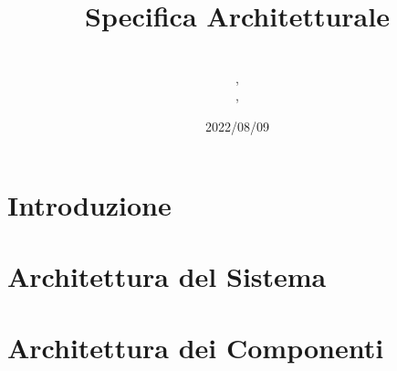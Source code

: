 \documentclass{classes/base}
\title{Specifica Architetturale}
\date{2022/08/09}
\author{\\ \marcov, \\ \marcob, \\ \matteo}
\begin{document}
	\maketitle
	\newpage
	
	\newpage
	\tableofcontents
	\newpage
	\listoffigures
  
	\newpage
	\section{Introduzione}
	

	\newpage
	\section{Architettura del Sistema}
	

	\newpage
	\section{Architettura dei Componenti}
	
\end{document}
